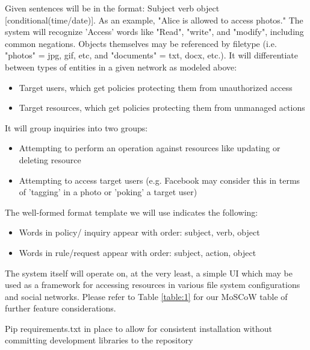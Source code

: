 \documentclass[12pt]{article}
\begin{document}
Given sentences will be in the format: Subject verb object [conditional(time/date)]. As an example, "Alice is allowed to access photos."
The system will recognize 'Access' words like "Read", "write", and "modify", including common negations. Objects themselves may be referenced by filetype (i.e. "photos" = jpg, gif, etc, and "documents" = txt, docx, etc.). It will differentiate between types of entities in a given network as modeled above:
\begin{itemize}
    \item Target users, which get policies protecting them from unauthorized access
    \item Target resources, which get policies protecting them from unmanaged actions
\end{itemize}
It will group inquiries into two groups:
\begin{itemize}
    \item Attempting to perform an operation against resources like updating or deleting resource
    \item Attempting to access target users (e.g. Facebook may consider this in terms of 'tagging' in a photo or 'poking' a target user)
\end{itemize}
The well-formed format template we will use indicates the following:
\begin{itemize}
    \item Words in policy/ inquiry appear with order: subject, verb, object
    \item Words in rule/request appear with order: subject, action, object
\end{itemize}

The system itself will operate on, at the very least, a simple UI which may be used as a framework for accessing resources in various file system configurations and social networks. Please refer to Table \ref{table:1} for our MoSCoW table of further feature considerations.

Pip requirements.txt in place to allow for consistent installation without committing development libraries to the repository
\end{document}
